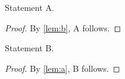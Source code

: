 \documentclass{article}
\begin{document}
\begin{lemma}\label{lem:a}
Statement A.
\end{lemma}
\begin{proof}
By \ref{lem:b}, A follows.
\end{proof}

\begin{lemma}\label{lem:b}
Statement B.
\end{lemma}
\begin{proof}
By \ref{lem:a}, B follows.
\end{proof}
\end{document}
